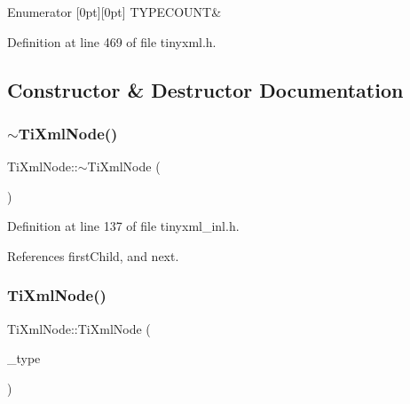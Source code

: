\begin{DoxyEnumFields}{Enumerator}
[0pt][0pt]{}\hypertarget{class_ti_xml_node_a836eded4920ab9e9ef28496f48cd95a2a8334037fb3fe05c67d6110975b38a8bf}{}\label{class_ti_xml_node_a836eded4920ab9e9ef28496f48cd95a2a8334037fb3fe05c67d6110975b38a8bf} 
T\+Y\+P\+E\+C\+O\+U\+NT&\\
\hline

\end{DoxyEnumFields}


Definition at line 469 of file tinyxml.\+h.



\subsection{Constructor \& Destructor Documentation}
\hypertarget{class_ti_xml_node_a027a76cccd359c831ee4024b58c49625}{}\label{class_ti_xml_node_a027a76cccd359c831ee4024b58c49625} 
\subsubsection{\texorpdfstring{$\sim$\+Ti\+Xml\+Node()}{~TiXmlNode()}}
{\footnotesize\ttfamily Ti\+Xml\+Node\+::$\sim$\+Ti\+Xml\+Node (\begin{DoxyParamCaption}{ }\end{DoxyParamCaption})\hspace{0.3cm}{\ttfamily [virtual]}}



Definition at line 137 of file tinyxml\+\_\+inl.\+h.



References first\+Child, and next.

\hypertarget{class_ti_xml_node_a3f46721695868667113c7487ff123f20}{}\label{class_ti_xml_node_a3f46721695868667113c7487ff123f20} 
\subsubsection{\texorpdfstring{Ti\+Xml\+Node()}{TiXmlNode()}\hspace{0.1cm}{\footnotesize\ttfamily [1/2]}}
{\footnotesize\ttfamily Ti\+Xml\+Node\+::\+Ti\+Xml\+Node (\begin{DoxyParamCaption}\item[{\hyperlink{class_ti_xml_node_a836eded4920ab9e9ef28496f48cd95a2}{Node\+Type}}]{\+\_\+type }\end{DoxyParamCaption})\hspace{0.3cm}{\ttfamily [protected]}}



